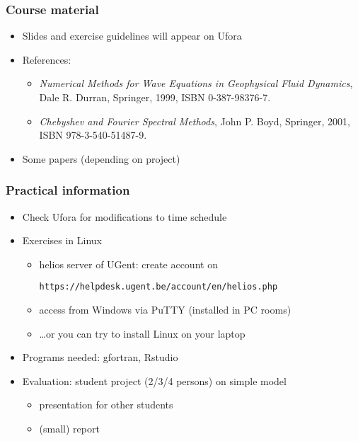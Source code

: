\documentclass[aspectratio=43,9pt]{beamer}
\begin{document}
%
\begin{frame}
	\frametitle{Course material}
	\vspace*{-5mm}
	\begin{itemize}
		\item Slides and exercise guidelines will appear on Ufora\vspace*{3ex}
		\item References:\vspace*{2ex}
			\begin{itemize}
				\item \emph{Numerical Methods for Wave Equations in Geophysical Fluid Dynamics},\\ Dale R. Durran, Springer, 1999, ISBN 0-387-98376-7.\vspace*{2ex}
				\item \emph{Chebyshev and Fourier Spectral Methods}, John P. Boyd, Springer, 2001, ISBN 978-3-540-51487-9.\vspace*{3ex}
			\end{itemize}
		\item Some papers (depending on project)
	\end{itemize}
\end{frame}
%
%
\begin{frame}
	\frametitle{Practical information}
	\begin{itemize}
		\item Check Ufora for modifications to time schedule\vspace*{2ex}
		\item Exercises in Linux\vspace*{1ex}
			\begin{itemize}
				\item helios server of UGent: create account on
					\par
					\texttt{https://helpdesk.ugent.be/account/en/helios.php}\vspace*{1ex}
				\item access from Windows via PuTTY (installed in PC rooms)\vspace*{1ex}
				\item \ldots or you can try to install Linux on your laptop\vspace*{2ex}
			\end{itemize}
		\item Programs needed: gfortran, Rstudio\vspace*{2ex}
		\item Evaluation: student project (2/3/4 persons) on simple model\vspace*{1ex}
			\begin{itemize}
				\item presentation for other students\vspace*{1ex}
				\item (small) report
			\end{itemize}
	\end{itemize}
\end{frame}
%
%
\begin{frame}
	\begin{center}
	\end{center}
\end{frame}
%
%
\end{document}
